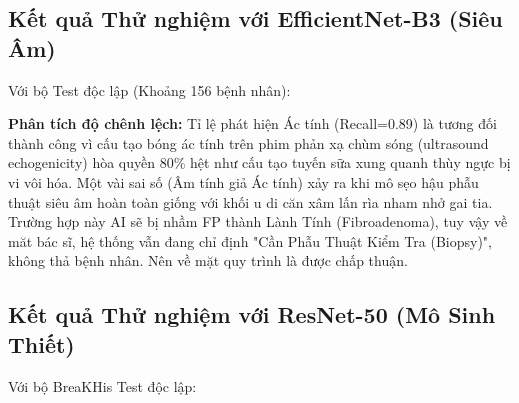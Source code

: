 \documentclass[conference,a4paper]{IEEEtran}
\begin{document}
\subsection{Kết quả Thử nghiệm với EfficientNet-B3 (Siêu Âm)}
Với bộ Test độc lập (Khoảng 156 bệnh nhân):
\begin{table}[H]
\centering
\caption{Chỉ số Đánh giá của Mạng Siêu Âm EfficientNet-B3}
\end{table}

\textbf{Phân tích độ chênh lệch:}
Tỉ lệ phát hiện Ác tính (Recall=0.89) là tương đối thành công vì cấu tạo bóng ác tính trên phim phản xạ chùm sóng (ultrasound echogenicity) hòa quyền 80\% hệt như cấu tạo tuyến sữa xung quanh thùy ngực bị vi vôi hóa. Một vài sai số (Âm tính giả Ác tính) xảy ra khi mô sẹo hậu phẫu thuật siêu âm hoàn toàn giống với khối u di căn xâm lấn rìa nham nhở gai tia. Trường hợp này AI sẽ bị nhầm FP thành Lành Tính (Fibroadenoma), tuy vậy về măt bác sĩ, hệ thống vẫn đang chỉ định "Cần Phẫu Thuật Kiểm Tra (Biopsy)", không thả bệnh nhân. Nên về mặt quy trình là được chấp thuận.

\subsection{Kết quả Thử nghiệm với ResNet-50 (Mô Sinh Thiết)}
Với bộ BreaKHis Test độc lập:
\begin{table}[H]
\centering
\caption{Chỉ số Đánh giá Mô hình ResNet-50 Dữ liệu Sinh thiết Tế bào Học (Histopathology)}
\end{table}
\end{document}
